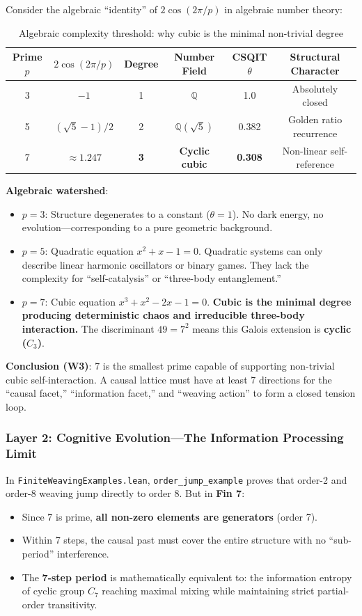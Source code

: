 \documentclass[aps,prd,twocolumn,nofootinbib,floatfix]{revtex4-2}
\begin{document}
Consider the algebraic ``identity'' of $2\cos(2\pi/p)$ in algebraic number theory:

\begin{table}[h]
\centering
\begin{tabular}{cccccc}
\hline
Prime $p$ & $2\cos(2\pi/p)$ & Degree & Number Field & CSQIT $\theta$ & Structural Character \\
\hline
3 & $-1$ & 1 & $\mathbb{Q}$ & 1.0 & Absolutely closed \\
5 & $(\sqrt{5}-1)/2$ & 2 & $\mathbb{Q}(\sqrt{5})$ & 0.382 & Golden ratio recurrence \\
7 & $\approx 1.247$ & \textbf{3} & \textbf{Cyclic cubic} & \textbf{0.308} & Non-linear self-reference \\
\hline
\end{tabular}
\caption{Algebraic complexity threshold: why cubic is the minimal non-trivial degree}
\label{tab:algebraic}
\end{table}

\textbf{Algebraic watershed}:
\begin{itemize}
    \item \textbf{$p=3$}: Structure degenerates to a constant ($\theta=1$). No dark energy, no evolution---corresponding to a pure geometric background.
    \item \textbf{$p=5$}: Quadratic equation $x^2 + x - 1 = 0$. Quadratic systems can only describe linear harmonic oscillators or binary games. They lack the complexity for ``self-catalysis'' or ``three-body entanglement.''
    \item \textbf{$p=7$}: Cubic equation $x^3 + x^2 - 2x - 1 = 0$. \textbf{Cubic is the minimal degree producing deterministic chaos and irreducible three-body interaction.} The discriminant $49 = 7^2$ means this Galois extension is \textbf{cyclic ($C_3$)}.
\end{itemize}

\textbf{Conclusion (W3)}: 7 is the smallest prime capable of supporting non-trivial cubic self-interaction. A causal lattice must have at least 7 directions for the ``causal facet,'' ``information facet,'' and ``weaving action'' to form a closed tension loop.

\subsubsection{Layer 2: Cognitive Evolution---The Information Processing Limit}

In \texttt{FiniteWeavingExamples.lean}, \texttt{order\_jump\_example} proves that order-2 and order-8 weaving jump directly to order 8. But in \textbf{Fin 7}:
\begin{itemize}
    \item Since 7 is prime, \textbf{all non-zero elements are generators} (order 7).
    \item Within 7 steps, the causal past must cover the entire structure with no ``sub-period'' interference.
    \item The \textbf{7-step period} is mathematically equivalent to: the information entropy of cyclic group $C_7$ reaching maximal mixing while maintaining strict partial-order transitivity.
\end{itemize}
\end{document}
